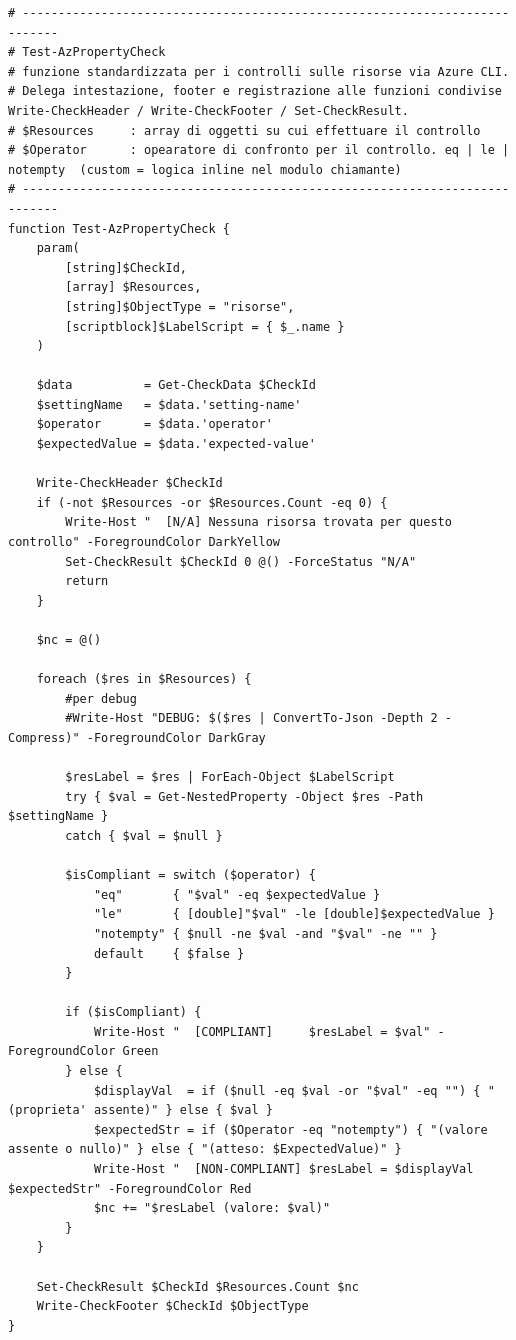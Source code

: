 \documentclass[a4paper,11pt]{report}
\begin{document}
\begin{lstlisting}[style=azcli, caption={Funzione \texttt{Test-AzPropertyCheck} per le verifiche sulle risorse Azure}, label={lst:test-az-property-check}]
# ---------------------------------------------------------------------------
# Test-AzPropertyCheck
# funzione standardizzata per i controlli sulle risorse via Azure CLI.
# Delega intestazione, footer e registrazione alle funzioni condivise Write-CheckHeader / Write-CheckFooter / Set-CheckResult.
# $Resources     : array di oggetti su cui effettuare il controllo
# $Operator      : opearatore di confronto per il controllo. eq | le | notempty  (custom = logica inline nel modulo chiamante)
# ---------------------------------------------------------------------------
function Test-AzPropertyCheck {
    param(
        [string]$CheckId,
        [array] $Resources,
        [string]$ObjectType = "risorse",
        [scriptblock]$LabelScript = { $_.name }
    )

    $data          = Get-CheckData $CheckId
    $settingName   = $data.'setting-name'
    $operator      = $data.'operator'
    $expectedValue = $data.'expected-value'

    Write-CheckHeader $CheckId
    if (-not $Resources -or $Resources.Count -eq 0) {
        Write-Host "  [N/A] Nessuna risorsa trovata per questo controllo" -ForegroundColor DarkYellow
        Set-CheckResult $CheckId 0 @() -ForceStatus "N/A"
        return
    }

    $nc = @()

    foreach ($res in $Resources) {
        #per debug
        #Write-Host "DEBUG: $($res | ConvertTo-Json -Depth 2 -Compress)" -ForegroundColor DarkGray

        $resLabel = $res | ForEach-Object $LabelScript
        try { $val = Get-NestedProperty -Object $res -Path $settingName }
        catch { $val = $null }

        $isCompliant = switch ($operator) {
            "eq"       { "$val" -eq $expectedValue }
            "le"       { [double]"$val" -le [double]$expectedValue }
            "notempty" { $null -ne $val -and "$val" -ne "" }
            default    { $false }
        }

        if ($isCompliant) {
            Write-Host "  [COMPLIANT]     $resLabel = $val" -ForegroundColor Green
        } else {                                    
            $displayVal  = if ($null -eq $val -or "$val" -eq "") { "(proprieta' assente)" } else { $val }
            $expectedStr = if ($Operator -eq "notempty") { "(valore assente o nullo)" } else { "(atteso: $ExpectedValue)" }
            Write-Host "  [NON-COMPLIANT] $resLabel = $displayVal $expectedStr" -ForegroundColor Red
            $nc += "$resLabel (valore: $val)"
        }
    }

    Set-CheckResult $CheckId $Resources.Count $nc
    Write-CheckFooter $CheckId $ObjectType
}
\end{lstlisting}
\end{document}
